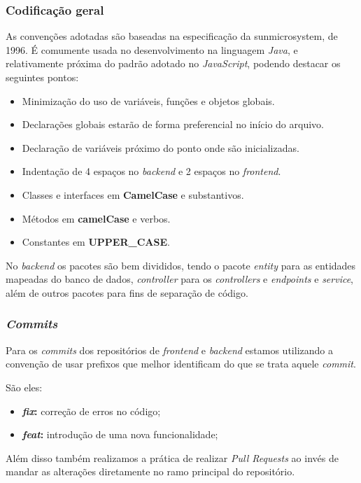 \subsubsection{Codificação geral}
As convenções adotadas são baseadas na especificação da \gls{sunmicrosystem}, de 1996. É comumente usada no desenvolvimento na linguagem \textit{Java}, e relativamente próxima do padrão adotado no \textit{JavaScript}, podendo destacar os seguintes pontos:

\begin{itemize}
    \item Minimização do uso de variáveis, funções e objetos globais.
    \item Declarações globais estarão de forma preferencial no início do arquivo.
    \item Declaração de variáveis próximo do ponto onde são inicializadas.
    \item Indentação de 4 espaços no\textit{ \gls{backend}} e 2 espaços no \textit{\gls{frontend}}.
    \item Classes e interfaces em \textbf{CamelCase} e substantivos.
    \item Métodos em \textbf{camelCase} e verbos.
    \item Constantes em \textbf{UPPER\_CASE}.
\end{itemize}

No \textit{\gls{backend}} os pacotes são bem divididos, tendo o pacote \textit{entity} para as entidades mapeadas do banco de dados, \textit{controller} para os \textit{controllers} e \textit{\glspl{endpoint}} e \textit{service}, além de outros pacotes para fins de separação de código.

\subsubsection{\textit{Commits}}
Para os \textit{commits} dos repositórios de \textit{\gls{frontend}} e \textit{\gls{backend}} estamos utilizando a convenção de usar prefixos que melhor identificam do que se trata aquele \textit{commit}.

São eles:
\begin{itemize}
	\item \textbf{\textit{fix}:} correção de erros no código;
	\item \textbf{\textit{feat}:} introdução de uma nova funcionalidade;
\end{itemize}

Além disso também realizamos a prática de realizar \textit{Pull Requests} ao invés de mandar as alterações diretamente no ramo principal do repositório.

